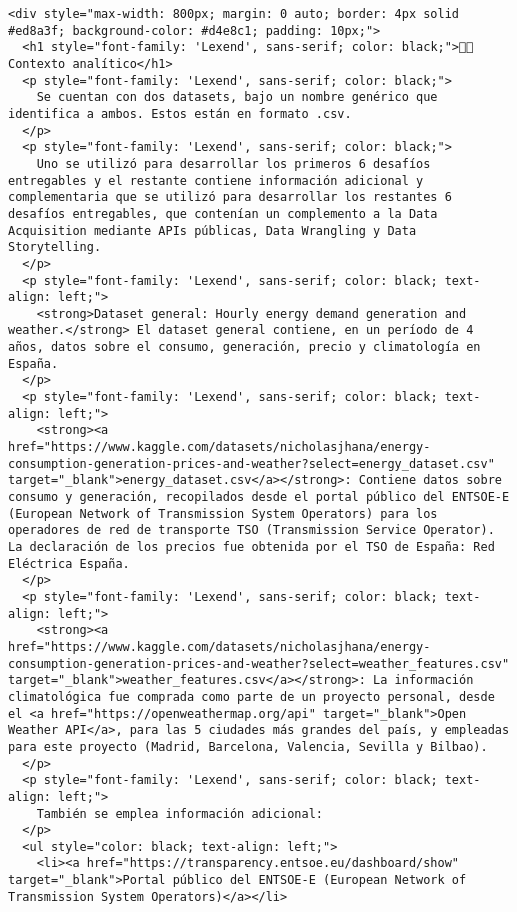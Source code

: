 \documentclass[11pt]{article}
\begin{document}
\begin{verbatim}
<div style="max-width: 800px; margin: 0 auto; border: 4px solid #ed8a3f; background-color: #d4e8c1; padding: 10px;">
  <h1 style="font-family: 'Lexend', sans-serif; color: black;">👨‍💻 Contexto analítico</h1>
  <p style="font-family: 'Lexend', sans-serif; color: black;">
    Se cuentan con dos datasets, bajo un nombre genérico que identifica a ambos. Estos están en formato .csv.
  </p>
  <p style="font-family: 'Lexend', sans-serif; color: black;">
    Uno se utilizó para desarrollar los primeros 6 desafíos entregables y el restante contiene información adicional y complementaria que se utilizó para desarrollar los restantes 6 desafíos entregables, que contenían un complemento a la Data Acquisition mediante APIs públicas, Data Wrangling y Data Storytelling.
  </p>
  <p style="font-family: 'Lexend', sans-serif; color: black; text-align: left;">
    <strong>Dataset general: Hourly energy demand generation and weather.</strong> El dataset general contiene, en un período de 4 años, datos sobre el consumo, generación, precio y climatología en España.
  </p>
  <p style="font-family: 'Lexend', sans-serif; color: black; text-align: left;">
    <strong><a href="https://www.kaggle.com/datasets/nicholasjhana/energy-consumption-generation-prices-and-weather?select=energy_dataset.csv" target="_blank">energy_dataset.csv</a></strong>: Contiene datos sobre consumo y generación, recopilados desde el portal público del ENTSOE-E (European Network of Transmission System Operators) para los operadores de red de transporte TSO (Transmission Service Operator). La declaración de los precios fue obtenida por el TSO de España: Red Eléctrica España.
  </p>
  <p style="font-family: 'Lexend', sans-serif; color: black; text-align: left;">
    <strong><a href="https://www.kaggle.com/datasets/nicholasjhana/energy-consumption-generation-prices-and-weather?select=weather_features.csv" target="_blank">weather_features.csv</a></strong>: La información climatológica fue comprada como parte de un proyecto personal, desde el <a href="https://openweathermap.org/api" target="_blank">Open Weather API</a>, para las 5 ciudades más grandes del país, y empleadas para este proyecto (Madrid, Barcelona, Valencia, Sevilla y Bilbao).
  </p>
  <p style="font-family: 'Lexend', sans-serif; color: black; text-align: left;">
    También se emplea información adicional:
  </p>
  <ul style="color: black; text-align: left;">
    <li><a href="https://transparency.entsoe.eu/dashboard/show" target="_blank">Portal público del ENTSOE-E (European Network of Transmission System Operators)</a></li>

\end{verbatim}
\end{document}
